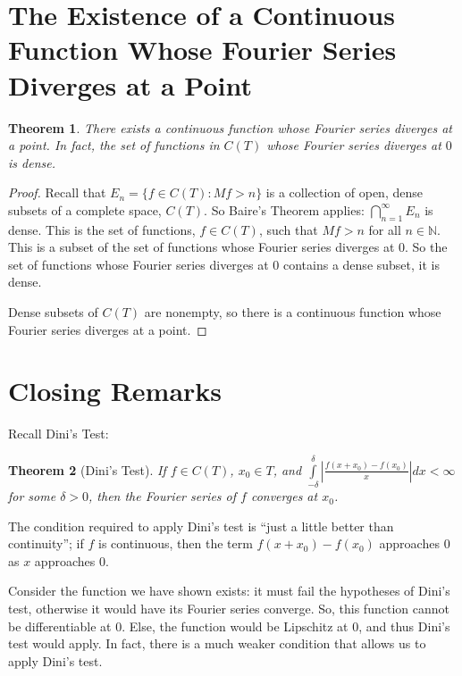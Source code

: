 \documentclass{amsart}
\newcommand{\de}{\delta}
\newcommand{\N}{\mathbb{N}}
\newcommand{\absval}[1]{\left| #1 \right|}
\newtheorem{thm}{Theorem}[section]
\theoremstyle{definition}
\begin{document}
\section{The Existence of a Continuous Function Whose Fourier Series Diverges at a Point}

\begin{thm}
There exists a continuous function whose Fourier series diverges at a point.
In fact, the set of functions in $C(T)$ whose Fourier series diverges at $0$ is dense.
\end{thm}

\begin{proof}

Recall that 
$E_n = \{f \in C(T) : Mf > n\}$
is a collection of open, dense subsets of a complete space, $C(T)$. 
So Baire's Theorem applies: $\bigcap\limits_{n=1}^\infty E_n $ is dense.
This is the set of functions, $f \in C(T)$, such that $Mf >n$ for all $n \in \N$.
This is a subset of the set of functions whose Fourier series diverges at $0$.
So the set of functions whose Fourier series diverges at $0$ contains a dense subset, it is dense.

Dense subsets of $C(T)$ are nonempty, so there is a continuous function whose Fourier series diverges at a point.

\end{proof}

\section{Closing Remarks}

Recall Dini's Test:

\begin{thm}[Dini's Test]
If $f \in C(T)$, $x_0 \in T$, and $\int\limits_{-\de}^{\de} \absval{\frac{f(x+x_0) - f(x_0)}{x}} dx < \infty$ for some $\de >0$, then the Fourier series of $f$ converges at $x_0$.
\end{thm}

The condition required to apply Dini's test is ``just a little better than continuity''; if $f$ is continuous, then the term $f(x+x_0) - f(x_0)$ approaches $0$ as $x$ approaches $0$.

Consider the function we have shown exists: it must fail the hypotheses of Dini's test, otherwise it would have its Fourier series converge. 
So, this function cannot be differentiable at $0$. 
Else, the function would be Lipschitz at $0$, and thus Dini's test would apply. 
In fact, there is a much weaker condition that allows us to apply Dini's test.
\end{document}
